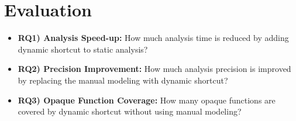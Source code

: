 \section{Evaluation}\label{sec:eval}

\begin{itemize}
  \item \textbf{RQ1) Analysis Speed-up:} How much analysis time is reduced by
    adding dynamic shortcut to static analysis?
  \item \textbf{RQ2) Precision Improvement:} How much analysis precision is
    improved by replacing the manual modeling with dynamic shortcut?
  \item \textbf{RQ3) Opaque Function Coverage:} How many opaque functions are
    covered by dynamic shortcut without using manual modeling?
\end{itemize}
